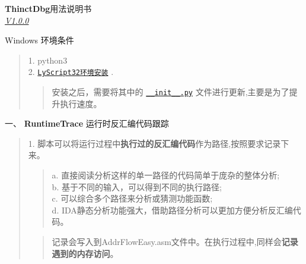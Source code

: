 \documentclass[AutoFakeBold,AutoFakeSlant]{article}
\newcommand{\hiddenlink}[2]{%
	\href{#1}{\texttt{#2}}%
}
\begin{document}
	
	\vspace{3cm}
	\begin{center}
		\Huge 
		\textbf{ThinctDbg}用法说明书\\
		{\Large \textit{\underline{V1.0.0}}}
		
	\end{center}
	\vspace{1cm}
	
	\leftline
	\bigskip
	\begin{flushleft}
		\begin{Large}
			Windows 环境条件
		\end{Large}
		\large 
		\linespread{1.2} \selectfont
		\begin{quote}
			1. python3\\
			2. \hiddenlink {https://github.com/lyshark/LyScript} {LyScript32环境安装}.
			\begin{quote}安装之后，需要将其中的\hiddenlink{https://github.com/thinct/ThinctDbg/blob/main/\_\_init\_\_.py}{\_\_init\_\_.py}文件进行更新,主要是为了提升执行速度。
			\end{quote}
		\end{quote}
		
		\vspace{1cm}
		
		\begin{LARGE}
			一、 \textbf{RuntimeTrace} 运行时反汇编代码跟踪
		\end{LARGE}
		
		\large 
		\linespread{1.6} \selectfont
		\begin{quote}
			1. 脚本可以将运行过程中\textbf{执行过的反汇编代码}作为路径,按照要求记录下来。\\
			\begin{quotation}
				a. 直接阅读分析这样的单一路径的代码简单于庞杂的整体分析;\\
				b. 基于不同的输入，可以得到不同的执行路径;\\
				c. 可以综合多个路径来分析或猜测功能函数;\\
				d. IDA静态分析功能强大，借助路径分析可以更加方便分析反汇编代码。
			\end{quotation}
			\begin{quotation}
			记录会写入到AddrFlowEasy.asm文件中。在执行过程中,同样会\textbf{记录遇到的内存访问}。
			\end{quotation}
		
			\newpage
			

\end{quote}
\end{flushleft}
\end{document}
